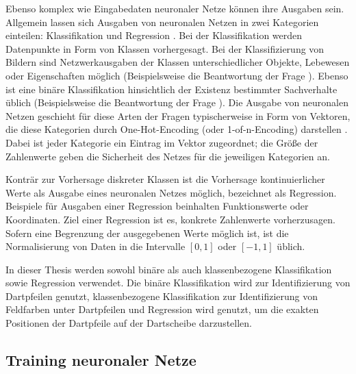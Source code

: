 Ebenso komplex wie Eingabedaten neuronaler Netze können ihre Ausgaben sein. Allgemein lassen sich Ausgaben von neuronalen Netzen in zwei Kategorien einteilen: Klassifikation und Regression \cite{nn_terminology,cv_general}.  %
Bei der Klassifikation werden Datenpunkte in Form von Klassen vorhergesagt. Bei der Klassifizierung von Bildern sind Netzwerkausgaben der Klassen unterschiedlicher Objekte, Lebewesen oder Eigenschaften möglich (Beispielsweise die Beantwortung der Frage ). Ebenso ist eine binäre Klassifikation hinsichtlich der Existenz bestimmter Sachverhalte üblich (Beispielsweise die Beantwortung der Frage ). Die Ausgabe von neuronalen Netzen geschieht für diese Arten der Fragen typischerweise in Form von Vektoren, die diese Kategorien durch One-Hot-Encoding (oder 1-of-n-Encoding) darstellen \cite{one_hot_encoding}. Dabei ist jeder Kategorie ein Eintrag im Vektor zugeordnet; die Größe der Zahlenwerte geben die Sicherheit des Netzes für die jeweiligen Kategorien an.

Konträr zur Vorhersage diskreter Klassen ist die Vorhersage kontinuierlicher Werte als Ausgabe eines neuronalen Netzes möglich, bezeichnet als Regression. Beispiele für Ausgaben einer Regression beinhalten Funktionswerte oder Koordinaten. Ziel einer Regression ist es, konkrete Zahlenwerte vorherzusagen. Sofern eine Begrenzung der ausgegebenen Werte möglich ist, ist die Normalisierung von Daten in die Intervalle $[0, 1]$ oder $[-1, 1]$ üblich.

In dieser Thesis werden sowohl binäre als auch klassenbezogene Klassifikation sowie Regression verwendet. Die binäre Klassifikation wird zur Identifizierung von Dartpfeilen genutzt, klassenbezogene Klassifikation zur Identifizierung von Feldfarben unter Dartpfeilen und Regression wird genutzt, um die exakten Positionen der Dartpfeile auf der Dartscheibe darzustellen.



\subsection{Training neuronaler Netze}
\label{sec:was_nn_training}

